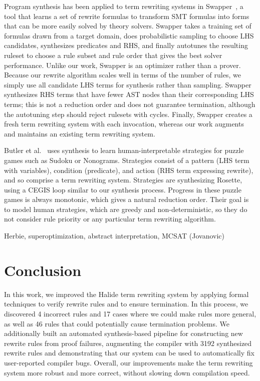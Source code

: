 \documentclass[sigplan,10pt,review,anonymous]{acmart}\settopmatter{printfolios=true,printccs=false,printacmref=false}
\newcommand{\NumRulesFixed}{{\color{red} 4}\xspace}
\newcommand{\NumPredicatesRelaxed}{{\color{red} 17}\xspace}
\newcommand{\NumOrderingProblems}{{\color{red} 46}\xspace}
\newcommand{\NumRulesSynthesized}{{\color{red} 3192}\xspace}
\begin{document}
Program synthesis has been applied to term rewriting systems in Swapper~\cite{singh2016swapper}, a tool that learns a set of rewrite formulas to transform SMT formulas into forms that can be more easily solved by theory solvers. Swapper takes a training set of formulas drawn from a target domain, does probabilistic sampling to choose LHS candidates, synthesizes predicates and RHS, and finally autotunes the resulting ruleset to choose a rule subset and rule order that gives the best solver performance. Unlike our work, Swapper is an optimizer rather than a prover. Because our rewrite algorithm scales well in terms of the number of rules, we simply use all candidate LHS terms for synthesis rather than sampling. Swapper synthesizes RHS terms that have fewer AST nodes than their corresponding LHS terms; this is not a reduction order and does not guarantee termination, although the autotuning step should reject rulesets with cycles. Finally, Swapper creates a fresh term rewriting system with each invocation, whereas our work augments and maintains an existing term rewriting system.

Butler et al.~\cite{butler2017synthesizing} uses synthesis to learn human-interpretable strategies for puzzle games such as Sudoku or Nonograms. Strategies consist of a pattern (LHS term with variables), condition (predicate), and action (RHS term expressing rewrite), and so comprise a term rewriting system. Strategies are synthesizing Rosette, using a CEGIS loop similar to our synthesis process. Progress in these puzzle games is always monotonic, which gives a natural reduction order. Their goal is to model human strategies, which are greedy and non-deterministic, so they do not consider rule priority or any particular term rewriting algorithm. 

Herbie, superoptimization, abstract interpretation, MCSAT (Jovanovic)

\section{Conclusion}
In this work, we improved the Halide term rewriting system by applying formal
techniques to verify rewrite rules and to ensure termination.  In this process,
we discovered \NumRulesFixed incorrect rules and \NumPredicatesRelaxed cases
where we could make rules more general, as well as \NumOrderingProblems rules
that could potentially cause termination problems.  We additionally built
an automated synthesis-based pipeline for constructing new rewrite rules from
proof failures, augmenting the compiler with \NumRulesSynthesized synthesized
rewrite rules and demonstrating that our system can be used to automatically fix
user-reported compiler bugs. Overall, our improvements make the term rewriting
system more robust and more correct, without slowing down compilation speed.
\end{document}
